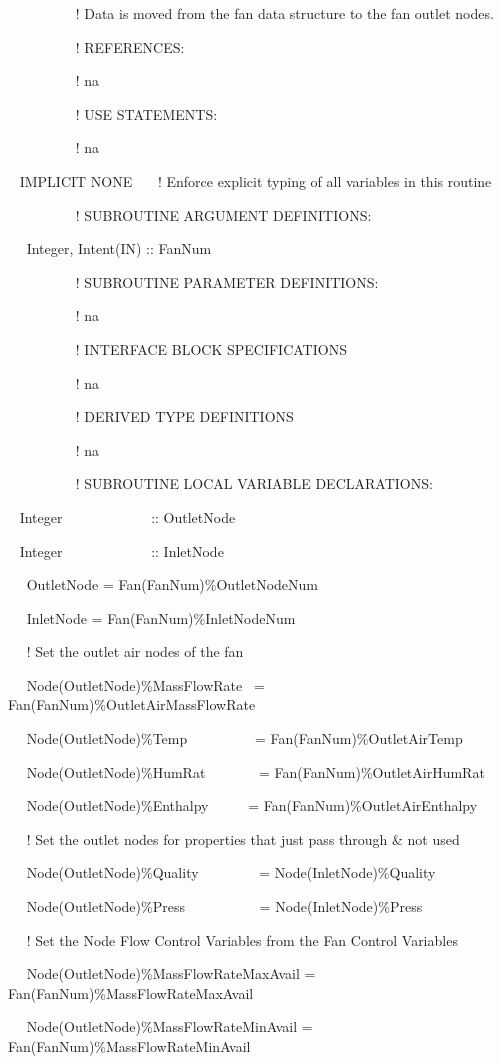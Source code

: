 ~~~~~~~~~ ! Data is moved from the fan data structure to the fan outlet nodes.

~~~~~~~~~ ! REFERENCES:

~~~~~~~~~ ! na

~~~~~~~~~ ! USE STATEMENTS:

~~~~~~~~~ ! na

~ IMPLICIT NONE~~~ ! Enforce explicit typing of all variables in this routine

~~~~~~~~~ ! SUBROUTINE ARGUMENT DEFINITIONS:

~~ Integer, Intent(IN) :: FanNum

~~~~~~~~~ ! SUBROUTINE PARAMETER DEFINITIONS:

~~~~~~~~~ ! na

~~~~~~~~~ ! INTERFACE BLOCK SPECIFICATIONS

~~~~~~~~~ ! na

~~~~~~~~~ ! DERIVED TYPE DEFINITIONS

~~~~~~~~~ ! na

~~~~~~~~~ ! SUBROUTINE LOCAL VARIABLE DECLARATIONS:

~ Integer~~~~~~~~~~~~ :: OutletNode

~ Integer~~~~~~~~~~~~ :: InletNode

~~ OutletNode = Fan(FanNum)\%OutletNodeNum

~~ InletNode = Fan(FanNum)\%InletNodeNum

~~ ! Set the outlet air nodes of the fan

~~ Node(OutletNode)\%MassFlowRate~ = Fan(FanNum)\%OutletAirMassFlowRate

~~ Node(OutletNode)\%Temp~~~~~~~~~ = Fan(FanNum)\%OutletAirTemp

~~ Node(OutletNode)\%HumRat~~~~~~~ = Fan(FanNum)\%OutletAirHumRat

~~ Node(OutletNode)\%Enthalpy~~~~~ = Fan(FanNum)\%OutletAirEnthalpy

~~ ! Set the outlet nodes for properties that just pass through \& not used

~~ Node(OutletNode)\%Quality~~~~~~~~ = Node(InletNode)\%Quality

~~ Node(OutletNode)\%Press~~~~~~~~~~ = Node(InletNode)\%Press

~~ ! Set the Node Flow Control Variables from the Fan Control Variables

~~ Node(OutletNode)\%MassFlowRateMaxAvail = Fan(FanNum)\%MassFlowRateMaxAvail

~~ Node(OutletNode)\%MassFlowRateMinAvail = Fan(FanNum)\%MassFlowRateMinAvail

